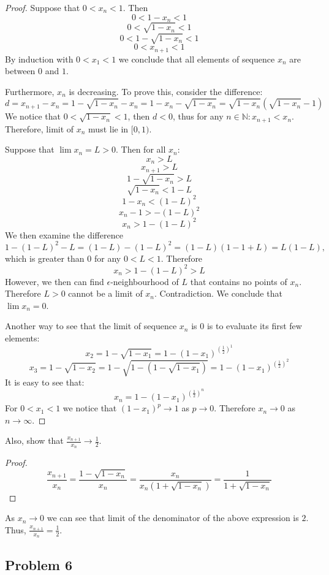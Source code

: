 \documentclass{article}
\begin{document}
\begin{proof}
Suppose that $0 < x_n < 1$. Then
$$ 0<1-x_n<1 $$
$$ 0<\sqrt{1-x_n}<1 $$
$$ 0<1-\sqrt{1-x_n}<1 $$
$$ 0<x_{n+1}<1 $$
By induction with $0 < x_1 < 1$ we conclude that all elements of sequence $x_n$ are between $0$ and $1$.

Furthermore, $x_n$ is decreasing. To prove this, consider the difference:
$$ d = x_{n+1} - x_n = 1-\sqrt{1-x_n} - x_n = 1-x_n - \sqrt{1-x_n} = \sqrt{1-x_n} \left(\sqrt{1-x_n}-1\right) $$
We notice that $0 < \sqrt{1-x_n} < 1$, then $d < 0$, thus for any $n\in\mathbb{N}: x_{n+1} < x_n$. Therefore, limit of $x_n$ must lie in $[0,1)$.

Suppose that $\lim x_n = L > 0$. Then for all $x_n$:
$$ x_n > L $$
$$ x_{n+1} > L $$
$$ 1-\sqrt{1-x_n} > L $$
$$ \sqrt{1-x_n} < 1-L $$
$$ 1-x_n < (1-L)^2 $$
$$ x_n-1 > -(1-L)^2 $$
$$ x_n > 1-(1-L)^2 $$
We then examine the difference
$$ 1-(1-L)^2 - L = (1-L) - (1-L)^2 = (1-L)(1-1+L) = L(1-L),$$
which is greater than $0$ for any $0<L<1$. Therefore
$$ x_n > 1-(1-L)^2 > L $$
However, we then can find $\epsilon$-neighbourhood of $L$ that contains no points of $x_n$. Therefore $L>0$ cannot be a limit of $x_n$. Contradiction. We conclude that $\lim x_n = 0$.

Another way to see that the limit of sequence $x_n$ is $0$ is to evaluate its first few elements:
$$ x_2 = 1-\sqrt{1-x_1} = 1-(1-x_1)^{\left(\frac{1}{2}\right)^1} $$
$$ x_3 = 1-\sqrt{1-x_2} = 1-\sqrt{1-\left(1-\sqrt{1-x_1}\right)} = 1-(1-x_1)^{\left(\frac{1}{2}\right)^2} $$
It is easy to see that:
$$ x_n = 1-(1-x_1)^{\left(\frac{1}{2}\right)^n} $$
For $0 < x_1 <1$ we notice that $(1-x_1)^p \to 1$ as $p \to 0$. Therefore $x_n \to 0$ as $n \to \infty$.

\end{proof}


\begin{tcolorbox}
Also, show that $\frac{x_{n+1}}{x_n} \to \frac{1}{2}$.
\end{tcolorbox}

\begin{proof}
$$ \frac{x_{n+1}}{x_n} = \frac{1-\sqrt{1-x_n}}{x_n} = \frac{x_n}{x_n \left( 1+\sqrt{1-x_n} \right) } = \frac{1}{1+\sqrt{1-x_n}}$$
\end{proof}
As $x_n \to 0$ we can see that limit of the denominator of the above expression is $2$. Thus, $\frac{x_{n+1}}{x_n} = \frac{1}{2}$.

\subsection*{Problem 6}
\end{document}
